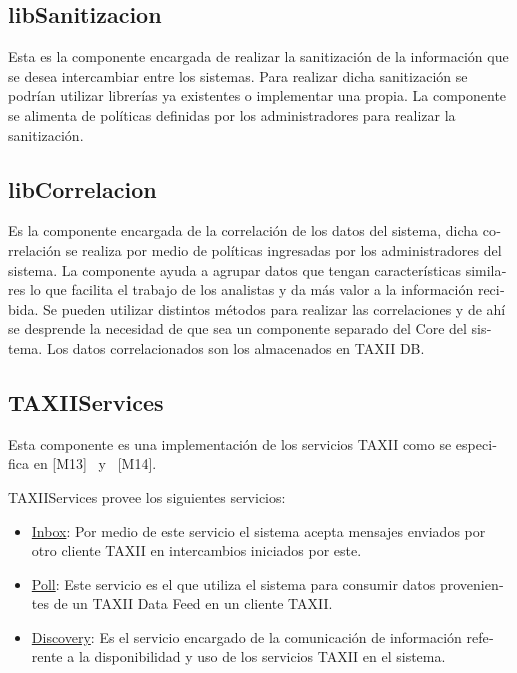 	\subsection[libSanitizacion]{\foreignlanguage{spanish}{libSanitizacion}}
	Esta es la componente encargada de realizar la sanitización de la información que se desea
		intercambiar entre los sistemas. Para realizar dicha sanitización se podrían utilizar librerías ya existentes o implementar una
		propia. La componente se alimenta de políticas definidas por los administradores para realizar la
		sanitización.
	
	\subsection[libCorrelacion]{\foreignlanguage{spanish}{libCorrelacion}}
	\foreignlanguage{spanish}{Es la componente encargada de la correlación de los datos del sistema, dicha correlación se
		realiza por medio de políticas ingresadas por los administradores del sistema. La componente ayuda a agrupar datos que
		tengan características similares lo que facilita el trabajo de los analistas y da más valor a la información recibida.
		Se pueden utilizar distintos métodos para realizar las correlaciones y de ahí se desprende la necesidad de que sea un
		componente separado del Core del sistema. Los datos correlacionados son los almacenados en TAXII DB.}
	
	\subsection[TAXIIServices]{\foreignlanguage{spanish}{TAXIIServices}}
	\foreignlanguage{spanish}{Esta componente es una implementación de los servicios TAXII como se especifica en [M13] \ y
		\ [M14]. }
	
	\foreignlanguage{spanish}{TAXIIServices provee los siguientes servicios:}
	
	\begin{itemize}
		\item \foreignlanguage{spanish}{\underline{Inbox}: Por medio de este servicio el sistema acepta mensajes enviados por otro cliente
			TAXII en intercambios iniciados por este. }
		\item \foreignlanguage{spanish}{\underline{Poll}: Este servicio es el que utiliza el sistema para consumir datos provenientes de un
			TAXII Data Feed en un cliente TAXII.}
		\item \foreignlanguage{spanish}{\underline{Discovery}: Es el servicio encargado de la comunicación de información referente a la
			disponibilidad y uso de los servicios TAXII en el sistema.}
	\end{itemize}
	
